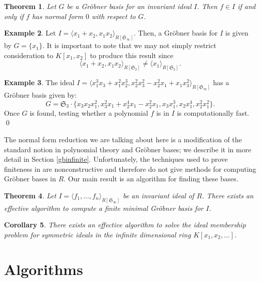 \documentclass{amsart}
\newtheorem{theorem}{Theorem}[section]
\newtheorem{corollary}[theorem]{Corollary}
\theoremstyle{definition}
\newtheorem{example}[theorem]{Example}
\theoremstyle{remark}
\numberwithin{equation}{section}
\newcommand{\<}{\langle}
\renewcommand{\>}{\rangle}
\begin{document}
\begin{theorem}
Let $G$ be a Gr\"obner basis for an invariant ideal $I$.  Then $f \in I$ 
if and only if $f$ has normal form $0$ with respect to $G$.
\end{theorem}

\begin{example}\label{trunccounterex}
Let $I = \<x_1 + x_2, x_1 x_2\>_{R[{\mathfrak S}_{\infty}]}$.  Then, a
Gr\"obner basis for $I$ is given by $G = \{x_1\}$.  It is important to note that we may not 
simply restrict consideration to $K[x_1,x_2]$ to produce this result since
\[  \<x_1 + x_2, x_1 x_2\>_{R[{\mathfrak S}_{2}]} \neq  \<x_1\>_{R[{\mathfrak S}_{2}]}.\]
\end{example}

\begin{example}
The ideal $I = \<x_1^3 x_3 + x_1^2 x_2^3, 
x_2^2 x_3^2 - x_2^2 x_1 + x_1 x_3^2\>_{R[{\mathfrak S}_{\infty}]}$ has a 
Gr\"obner basis given by:
\[ G = {\mathfrak S}_{3} \cdot \{x_3 x_2 x_1^2, x_3^2 x_1 + x_2^4 x_1 - x_2^2 x_1, 
x_3 x_1^3, x_2 x_1^4, x_2^2 x_1^2\}.\]
Once $G$ is found, testing whether a polynomial $f$ is in $I$ is computationally fast.
\qed
\end{example}

The normal form reduction we are talking about here is a modification of the
standard notion in polynomial theory and Gr\"obner bases;  
we describe it in more detail in Section \ref{gbinfinite}.
Unfortunately, the techniques used to
prove finiteness in \cite{AH} are nonconstructive and therefore do not
give methods for computing Gr\"obner bases in $R$.
Our main result is an algorithm for finding these bases.

\begin{theorem}
Let $I = \<f_1, \ldots, f_n\>_{R[{\mathfrak S}_{\infty}]}$ be an invariant ideal of $R$.
There exists an effective algorithm to compute a finite minimal Gr\"obner basis for $I$.
\end{theorem}

\begin{corollary}
There exists an effective algorithm to solve the ideal membership problem
for symmetric ideals in the infinite dimensional ring $K[x_1,x_2,\ldots]$.
\end{corollary}

\section{Algorithms}
\end{document}
